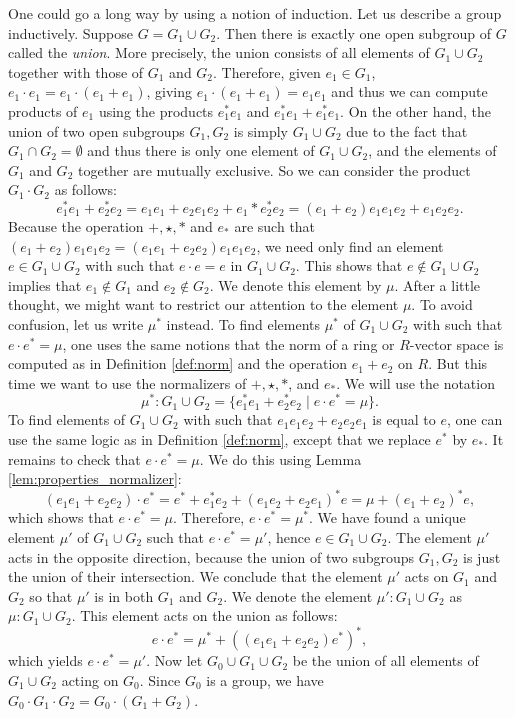 \documentclass[a4paper,reqno,oneside]{article}
\begin{document}
One could go a long way by using a notion of induction. Let us describe a group inductively. Suppose $G = G_1 \cup G_2$. Then there is exactly one open subgroup of $G$ called the \emph{union}.  More precisely, the union consists of all elements of $G_1 \cup G_2$ together with those of $G_1$ and $G_2$. Therefore, given $e_1 \in G_1$, $e_1 \cdot e_1 = e_1 \cdot (e_1+e_1)$, giving $e_1 \cdot (e_1+e_1)=e_1e_1$ and thus we can compute products of $e_1$ using the products $e_1^*e_1$ and $e_1^*e_1 + e_1^*e_1$. On the other hand, the union of two open subgroups $G_1, G_2$ is simply $G_1\cup G_2$ due to the fact that $G_1 \cap G_2 = \emptyset$ and thus there is only one element of $G_1\cup G_2$, and the elements of $G_1$ and $G_2$ together are mutually exclusive. So we can consider the product $G_1 \cdot G_2$ as follows: 
\[
e_1^*e_1 + e_2^*e_2 = e_1e_1 + e_2e_1e_2 + e_1*e_2^*e_2 = (e_1+e_2)e_1e_1e_2 + e_1e_2e_2.
\]
Because the operation $+, \star, *$ and $e_*$ are such that $(e_1+e_2)e_1e_1e_2 = (e_1e_1+e_2e_2)e_1e_1e_2$, we need only find an element $e \in G_1 \cup G_2$ with such that $e\cdot e = e$ in $G_1 \cup G_2$.  This shows that $e \notin G_1 \cup G_2$ implies that $e_1 \notin G_1$ and $e_2 \notin G_2$. We denote this element by $\mu$. After a little thought, we might want to restrict our attention to the element $\mu$.  To avoid confusion, let us write $\mu^*$ instead. To find elements $\mu^*$ of $G_1 \cup G_2$ with such that $e\cdot e^*=\mu$, one uses the same notions that the norm of a ring or $R$-vector space is computed as in Definition \ref{def:norm} and the operation $e_1 + e_2$ on $R$.  But this time we want to use the normalizers of $+, \star, *$, and $e_*$. We will use the notation 
\[
\mu^*: G_1 \cup G_2 = \{e_1^*e_1 + e_2^*e_2 \mid e\cdot e^*=\mu \}.
\] 
To find elements of $G_1 \cup G_2$ with such that $e_1e_1e_2 + e_2e_2e_1$ is equal to $e$, one can use the same logic as in Definition \ref{def:norm}, except that we replace $e^*$ by $e_*$.  It remains to check that $e \cdot e^* = \mu$.  We do this using Lemma \ref{lem:properties_normalizer}: 
\[
(e_1e_1 + e_2e_2)\cdot e^* = e^* + e_1^*e_2 + (e_1e_2 + e_2e_1)^*e = \mu + (e_1 + e_2)^*e,
\]
which shows that $e \cdot e^* = \mu$. Therefore, $e \cdot e^* = \mu^*$. We have found a unique element $\mu'$ of $G_1 \cup G_2$ such that $e \cdot e^* = \mu'$, hence $e \in G_1 \cup G_2$. The element $\mu'$ acts in the opposite direction, because the union of two subgroups $G_1, G_2$ is just the union of their intersection. We conclude that the element $\mu'$ acts on $G_1$ and $G_2$ so that $\mu'$ is in both $G_1$ and $G_2$. We denote the element $\mu' : G_1 \cup G_2$ as $\mu: G_1 \cup G_2$. This element acts on the union as follows: 
\[
e \cdot e^* = \mu^* + \left((e_1e_1 + e_2e_2)e^*\right)^*,
\]
which yields $e \cdot e^* = \mu'.$ 
Now let $G_0 \cup G_1 \cup G_2$ be the union of all elements of $G_1 \cup G_2$ acting on $G_0$.  Since $G_0$ is a group, we have $G_0 \cdot G_1 \cdot G_2 = G_0 \cdot (G_1 + G_2)$. 
\end{document}
